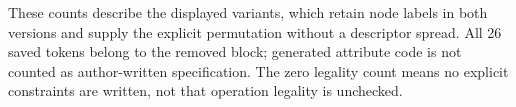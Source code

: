 These counts describe the displayed variants, which retain node labels in
both versions and supply the explicit permutation without a descriptor
spread. All 26 saved tokens belong to the removed  block;
generated attribute code is not counted as author-written specification.
The zero legality count means no explicit constraints are written, not that
operation legality is unchecked.
\FloatBarrier

